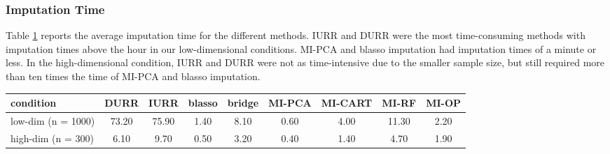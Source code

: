 \FloatBarrier

\subsubsection{Imputation Time}

	Table \ref{tab:time} reports the average imputation time for the different methods.
	IURR and DURR were the most time-consuming methods with imputation times above the hour 
	in our low-dimensional conditions. 
	MI-PCA and blasso imputation had imputation times of a minute or less.
	In the high-dimensional condition, IURR and DURR were not as time-intensive due to the smaller
	sample size, but still required more than ten times the time of MI-PCA and blasso imputation.

\begin{table}
	{
	\begin{tabular}{l c c c c c c c c} 
		\toprule
		condition & DURR & IURR & blasso & bridge & MI-PCA & MI-CART & MI-RF & MI-OP \\
		\midrule
		low-dim (n = 1000) & 73.20 & 75.90 & 1.40 & 8.10 & 0.60 & 4.00 & 11.30 & 2.20 \\ 
		high-dim (n = 300) & 6.10 & 9.70 & 0.50 & 3.20 & 0.40 & 1.40 & 4.70 & 1.90 \\	
		\bottomrule
	\end{tabular}
	}
\label{tab:time}
\end{table}

\FloatBarrier


